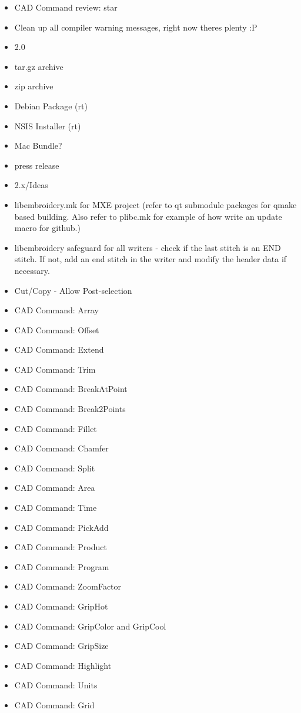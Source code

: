 \begin{itemize}
  \item CAD Command review: star
  \item Clean up all compiler warning messages, right now theres plenty :P
\item 2.0
  \item tar.gz archive
  \item zip archive
  \item Debian Package (rt)
  \item NSIS Installer (rt)
  \item Mac Bundle?
  \item press release
\item 2.x/Ideas
  \item libembroidery.mk for MXE project (refer to qt submodule packages for qmake based building. Also refer to plibc.mk for example of how write an update macro for github.)
  \item libembroidery safeguard for all writers - check if the last stitch is an END stitch. If not, add an end stitch in the writer and modify the header data if necessary.
  \item Cut/Copy - Allow Post-selection
  \item CAD Command: Array
  \item CAD Command: Offset
  \item CAD Command: Extend
  \item CAD Command: Trim
  \item CAD Command: BreakAtPoint
  \item CAD Command: Break2Points
  \item CAD Command: Fillet
  \item CAD Command: Chamfer
  \item CAD Command: Split
  \item CAD Command: Area
  \item CAD Command: Time
  \item CAD Command: PickAdd
  \item CAD Command: Product
  \item CAD Command: Program
  \item CAD Command: ZoomFactor
  \item CAD Command: GripHot
  \item CAD Command: GripColor and GripCool
  \item CAD Command: GripSize
  \item CAD Command: Highlight
  \item CAD Command: Units
  \item CAD Command: Grid

\end{itemize}
